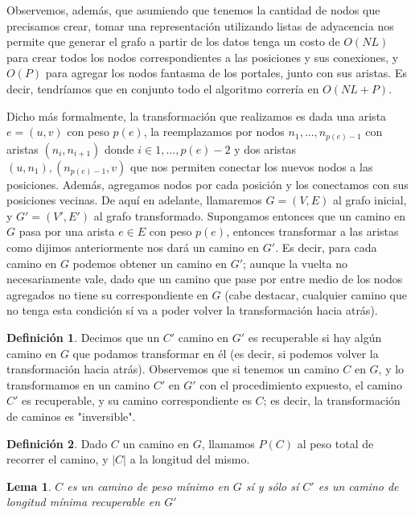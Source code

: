 \documentclass{article}
\newtheorem{lemma}{Lema}[theorem]
\theoremstyle{definition}
\newtheorem{definition}{Definición}[section]
\theoremstyle{remark}
\begin{document}
Observemos, además, que asumiendo que tenemos la cantidad de nodos que precisamos crear, tomar una representación utilizando listas de adyacencia nos permite que generar el grafo a partir de los datos tenga un costo de $O(NL)$ para crear todos los nodos correspondientes a las posiciones y sus conexiones, y $O(P)$ para agregar los nodos fantasma de los portales, junto con sus aristas. Es decir, tendríamos que en conjunto todo el algoritmo correría en $O(NL + P)$.

Dicho más formalmente, la transformación que realizamos es dada una arista $e = (u, v)$ con peso $p(e)$, la reemplazamos por nodos $n_1, ..., n_{p(e)-1}$ con aristas $(n_i, n_{i+1})$ donde $i \in {1, ..., p(e) - 2}$ y dos aristas $(u, n_1), (n_{p(e)-1}, v)$ que nos permiten conectar los nuevos nodos a las posiciones. Además, agregamos nodos por cada posición y los conectamos con sus posiciones vecinas. De aquí en adelante, llamaremos $G = (V, E)$ al grafo inicial, y $G' = (V', E')$ al grafo transformado. Supongamos entonces que un camino en $G$ pasa por una arista $e \in E$ con peso $p(e)$, entonces transformar a las aristas como dijimos anteriormente nos dará un camino en $G'$. Es decir, para cada camino en $G$ podemos obtener un camino en $G'$; aunque la vuelta no necesariamente vale, dado que un camino que pase por entre medio de los nodos agregados no tiene su correspondiente en $G$ (cabe destacar, cualquier camino que no tenga esta condición sí va a poder volver la transformación hacia atrás).

\begin{definition}
Decimos que un $C'$ camino en $G'$ es recuperable si hay algún camino en $G$ que podamos transformar en él (es decir, si podemos volver la transformación hacia atrás). Observemos que si tenemos un camino $C$ en $G$, y lo transformamos en un camino $C'$ en $G'$ con el procedimiento expuesto, el camino $C'$ es recuperable, y su camino correspondiente es $C$; es decir, la transformación de caminos es "inversible".
\end{definition}

\begin{definition}
Dado $C$ un camino en $G$, llamamos $P(C)$ al peso total de recorrer el camino, y $|C|$ a la longitud del mismo.
\end{definition}

\begin{lemma}
$C$ es un camino de peso mínimo en $G$ sí y sólo sí $C'$ es un camino de longitud mínima recuperable en $G'$
\end{lemma}
\end{document}
